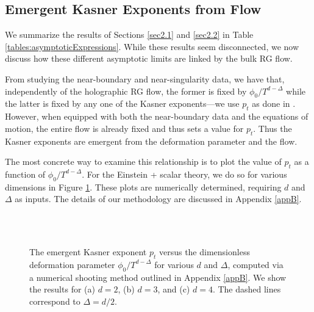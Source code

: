 \documentclass[12pt,a4paper]{article}
\begin{document}
\subsection{Emergent Kasner Exponents from Flow}\label{sec2.3}



We summarize the results of Sections \ref{sec2.1} and \ref{sec2.2} in Table \ref{tables:asymptoticExpressions}. While these results seem disconnected, we now discuss how these different asymptotic limits are linked by the bulk RG flow.

From studying the near-boundary and near-singularity data, we have that, independently of the holographic RG flow, the former is fixed by $\phi_0/T^{d-\Delta}$ while the latter is fixed by any one of the Kasner exponents---we use $p_t$ as done in \cite{Frenkel:2020ysx,Wang:2020nkd}. However, when equipped with both the near-boundary data and the equations of motion, the entire flow is already fixed and thus sets a value for $p_t$. Thus the Kasner exponents are emergent from the deformation parameter and the flow.

The most concrete way to examine this relationship is to plot the value of $p_t$ as a function of $\phi_0/T^{d-\Delta}$. For the Einstein + scalar theory, we do so for various dimensions in Figure \ref{figs:kasnerVsDef}. These plots are numerically determined, requiring $d$ and $\Delta$ as inputs. The details of our methodology are discussed in Appendix \ref{appB}.
{
\begin{figure}
\centering
{}\\\vspace{0.4cm}
\\\vspace{0.4cm}
\caption{The emergent Kasner exponent $p_t$ versus the dimensionless deformation parameter $\phi_0/T^{d-\Delta}$ for various $d$ and $\Delta$, computed via a numerical shooting method outlined in Appendix \ref{appB}. We show the results for (a) $d = 2$, (b) $d = 3$, and (c) $d = 4$. The dashed lines correspond to $\Delta = d/2$.}
\label{figs:kasnerVsDef}
\end{figure}
}
\end{document}
